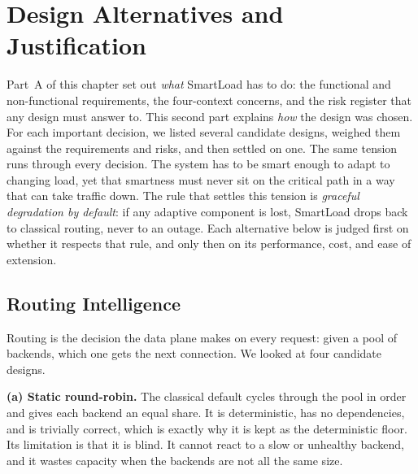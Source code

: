 
\section{Design Alternatives and Justification}
\label{ch:design_solution}

Part~A of this chapter set out \emph{what} SmartLoad has to do: the functional
and non-functional requirements, the four-context concerns, and the risk
register that any design must answer to. This second part explains \emph{how}
the design was chosen. For each important decision, we listed several candidate
designs, weighed them against the requirements and risks, and then settled on
one. The same tension runs through every decision. The system has to be smart
enough to adapt to changing load, yet that smartness must never sit on the
critical path in a way that can take traffic down. The rule that settles this
tension is \emph{graceful degradation by default}: if any adaptive component is
lost, SmartLoad drops back to classical routing, never to an outage. Each
alternative below is judged first on whether it respects that rule, and only
then on its performance, cost, and ease of extension.

\subsection{Routing Intelligence}
\label{dsb:alt-routing}

Routing is the decision the data plane makes on every request: given a pool of
backends, which one gets the next connection. We looked at four candidate
designs.

\textbf{(a) Static round-robin.} The classical default cycles through the pool
in order and gives each backend an equal share. It is deterministic, has no
dependencies, and is trivially correct, which is exactly why it is kept as the
deterministic floor. Its limitation is that it is blind. It cannot react to a
slow or unhealthy backend, and it wastes capacity when the backends are not all
the same size.

